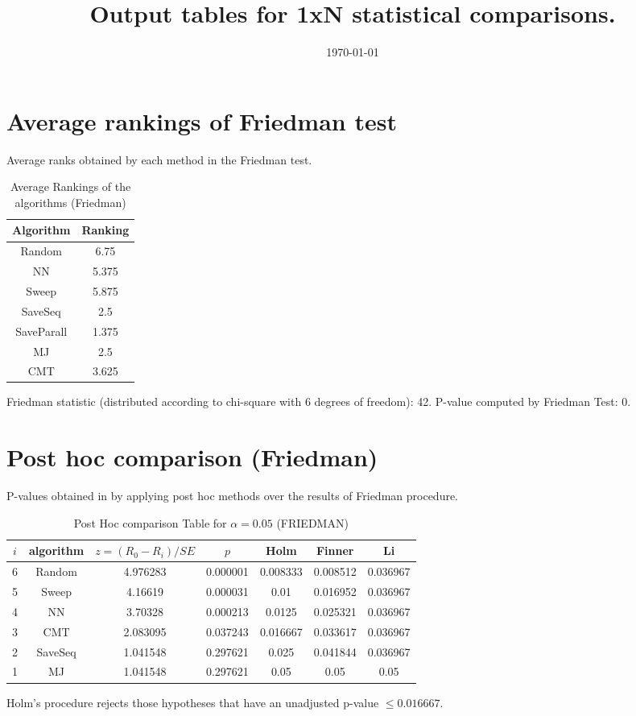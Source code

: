 \documentclass[a4paper,10pt]{article}
\title{Output tables for 1xN statistical comparisons.}
\author{}
\date{\today}
\begin{document}
\begin{landscape}
\pagestyle{empty}
\maketitle
\thispagestyle{empty}

\section{Average rankings of Friedman test}


Average ranks obtained by each method in the Friedman test.

\begin{table}[!htp]
\centering
\begin{tabular}{|c|c|}\hline
Algorithm&Ranking\\\hline
Random&6.75\\NN&5.375\\Sweep&5.875\\SaveSeq&2.5\\SaveParall&1.375\\MJ&2.5\\CMT&3.625\\\hline\end{tabular}
\caption{Average Rankings of the algorithms (Friedman)}
\end{table}

Friedman statistic (distributed according to chi-square with 6 degrees of freedom): 42. \newline P-value computed by Friedman Test: 0.\newline


\newpage

\section{Post hoc comparison (Friedman)}


P-values obtained in by applying post hoc methods over the results of Friedman procedure.

\begin{table}[!htp]
\centering\footnotesize
\begin{tabular}{ccccccc}
$i$&algorithm&$z=(R_0 - R_i)/SE$&$p$&Holm &Finner&Li\\
\hline6&Random&4.976283&0.000001&0.008333&0.008512&0.036967\\5&Sweep&4.16619&0.000031&0.01&0.016952&0.036967\\4&NN&3.70328&0.000213&0.0125&0.025321&0.036967\\3&CMT&2.083095&0.037243&0.016667&0.033617&0.036967\\2&SaveSeq&1.041548&0.297621&0.025&0.041844&0.036967\\1&MJ&1.041548&0.297621&0.05&0.05&0.05\\\hline
\end{tabular}
\caption{Post Hoc comparison Table for $\alpha=0.05$ (FRIEDMAN)}
\end{table}Holm's procedure rejects those hypotheses that have an unadjusted p-value $\le0.016667$.


\end{landscape}
\end{document}
